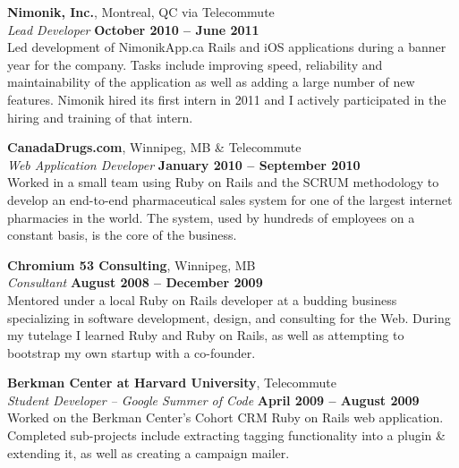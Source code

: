 \documentclass[margin,line,letterpaper]{resume}
\begin{document}
\begin{resume}
  {\bf Nimonik, Inc.}, Montreal, QC via Telecommute \vspace{2mm}\\\vspace{1mm}%
  {\sl Lead Developer} \hfill {\bf October 2010 -- June 2011}\\
  Led development of NimonikApp.ca Rails and iOS applications during a banner year for the company. Tasks include improving speed, reliability and maintainability of the application as well as adding a large number of new features. Nimonik hired its first intern in 2011 and I actively participated in the hiring and training of that intern.

  {\bf CanadaDrugs.com}, Winnipeg, MB \& Telecommute \vspace{2mm}\\\vspace{1mm}%
  {\sl Web Application Developer} \hfill {\bf January 2010 -- September 2010}\\
  Worked in a small team using Ruby on Rails and the SCRUM methodology to develop an end-to-end pharmaceutical sales system for one of the largest internet pharmacies in the world. The system, used by hundreds of employees on a constant basis, is the core of the business.

  {\bf Chromium 53 Consulting}, Winnipeg, MB \vspace{2mm}\\\vspace{1mm}%
  {\sl Consultant} \hfill {\bf August 2008 -- December 2009}\\
  Mentored under a local Ruby on Rails developer at a budding business specializing in software development, design, and consulting for the Web. During my tutelage I learned Ruby and Ruby on Rails, as well as attempting to bootstrap my own startup with a co-founder.

  {\bf Berkman Center at Harvard University}, Telecommute \vspace{2mm}\\\vspace{1mm}%
  {\sl Student Developer – Google Summer of Code} \hfill {\bf April 2009 -- August 2009}\\
  Worked on the Berkman Center’s Cohort CRM Ruby on Rails web application. Completed sub-projects include extracting tagging functionality into a plugin \& extending it, as well as creating a campaign mailer.


\end{resume}
\end{document}
